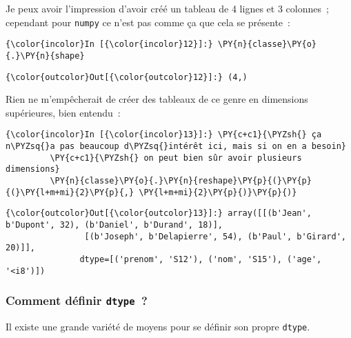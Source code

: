     Je peux avoir l'impression d'avoir créé un tableau de 4 lignes et 3
colonnes~; cependant pour \texttt{numpy} ce n'est pas comme ça que cela
se présente~:

    \begin{Verbatim}[commandchars=\\\{\},frame=single,framerule=0.3mm,rulecolor=\color{cellframecolor}]
{\color{incolor}In [{\color{incolor}12}]:} \PY{n}{classe}\PY{o}{.}\PY{n}{shape}
\end{Verbatim}


\begin{Verbatim}[commandchars=\\\{\},frame=single,framerule=0.3mm,rulecolor=\color{cellframecolor}]
{\color{outcolor}Out[{\color{outcolor}12}]:} (4,)
\end{Verbatim}
            
    Rien ne m'empêcherait de créer des tableaux de ce genre en dimensions
supérieures, bien entendu~:

    \begin{Verbatim}[commandchars=\\\{\},frame=single,framerule=0.3mm,rulecolor=\color{cellframecolor}]
{\color{incolor}In [{\color{incolor}13}]:} \PY{c+c1}{\PYZsh{} ça n\PYZsq{}a pas beaucoup d\PYZsq{}intérêt ici, mais si on en a besoin}
         \PY{c+c1}{\PYZsh{} on peut bien sûr avoir plusieurs dimensions}
         \PY{n}{classe}\PY{o}{.}\PY{n}{reshape}\PY{p}{(}\PY{p}{(}\PY{l+m+mi}{2}\PY{p}{,} \PY{l+m+mi}{2}\PY{p}{)}\PY{p}{)}
\end{Verbatim}


\begin{Verbatim}[commandchars=\\\{\},frame=single,framerule=0.3mm,rulecolor=\color{cellframecolor}]
{\color{outcolor}Out[{\color{outcolor}13}]:} array([[(b'Jean', b'Dupont', 32), (b'Daniel', b'Durand', 18)],
                [(b'Joseph', b'Delapierre', 54), (b'Paul', b'Girard', 20)]],
               dtype=[('prenom', 'S12'), ('nom', 'S15'), ('age', '<i8')])
\end{Verbatim}
            
    \hypertarget{comment-duxe9finir-dtype}{%
\subsubsection{\texorpdfstring{Comment définir
\texttt{dtype}~?}{Comment définir dtype~?}}\label{comment-duxe9finir-dtype}}

    Il existe une grande variété de moyens pour se définir son propre
\texttt{dtype}.

